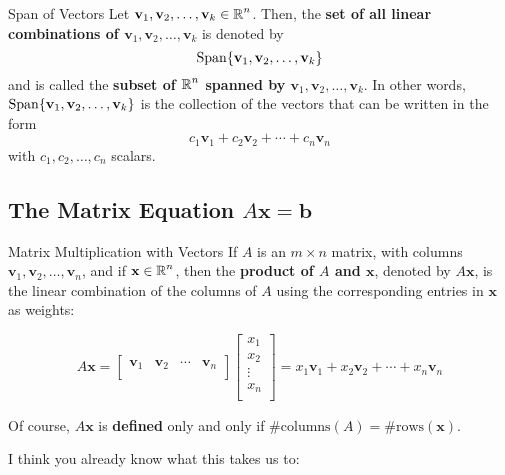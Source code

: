 \documentclass{article}
\begin{document}
\begin{definition}{Span of Vectors}
	Let $\mathbf{v}_1, \mathbf{v}_2, \ldots, \mathbf{v}_k \in \operatorname{\mathbb{R}}^n$. Then, the \textbf{set of all linear combinations of $\mathbf{v}_1, \mathbf{v}_2, \ldots, \mathbf{v}_k$} is denoted by
	$$
		\operatorname{Span}\{\mathbf{v}_1, \mathbf{v}_2, \ldots, \mathbf{v}_k\}
	$$
	and is called the \textbf{subset of $\operatorname{\mathbb{R}}^n$ spanned by $\mathbf{v}_1, \mathbf{v}_2, \ldots, \mathbf{v}_k$}. In other words, $\operatorname{Span}\{ \mathbf{v}_1, \mathbf{v}_2, \ldots, \mathbf{v}_k \}$ is the collection of the vectors that can be written in the form
	$$
		c_1\mathbf{v}_1 + c_2\mathbf{v}_2 + \cdots + c_n\mathbf{v}_n
	$$
	with $c_1, c_2, \ldots, c_n$ scalars.
\end{definition}

\subsection{The Matrix Equation $A\mathbf{x} = \mathbf{b}$}
\begin{definition}{Matrix Multiplication with Vectors}
	If $A$ is an $m \times n$ matrix, with columns $\mathbf{v}_1, \mathbf{v}_2, \ldots, \mathbf{v}_n$, and if $\mathbf{x} \in \operatorname{\mathbb{R}}^n$, then the \textbf{product of $A$ and $\mathbf{x}$}, denoted by $A\mathbf{x}$, is the linear combination of the columns of $A$ using the corresponding entries in $\mathbf{x}$ as weights:

	\begin{equation}
		A\mathbf{x}
		=
		\begin{bmatrix}
			\mathbf{v}_1 & \mathbf{v}_2 & \cdots & \mathbf{v}_n \\
		\end{bmatrix}
		\begin{bmatrix}
			x_1    \\
			x_2    \\
			\vdots \\
			x_n    \\
		\end{bmatrix}
		=
		x_1\mathbf{v}_1 + x_2\mathbf{v}_2 + \cdots + x_n\mathbf{v}_n
	\end{equation}
\end{definition}
Of course, $A\mathbf{x}$ is \textbf{defined} only and only if $\text{\#columns}(A) = \text{\#rows}(\mathbf{x})$.

I think you already know what this takes us to:
\end{document}

